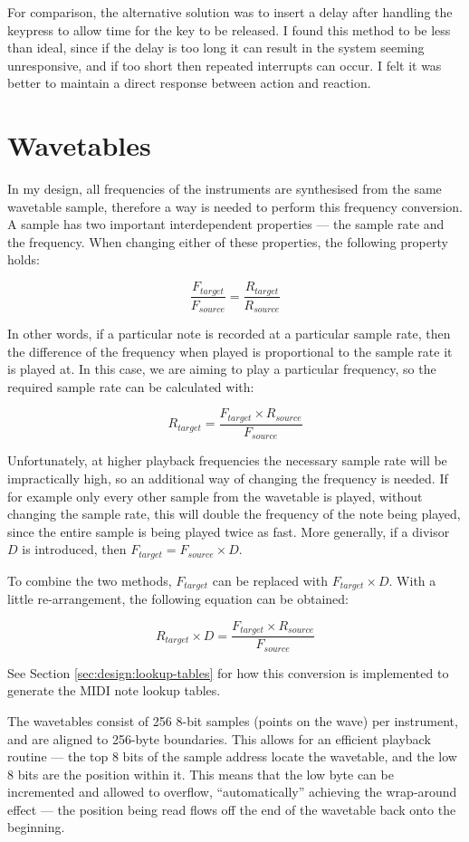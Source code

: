 For comparison, the alternative solution was to insert a delay after handling the keypress to allow 
time for the key to be released.  I found this method to be less than ideal, since if the delay is 
too long it can result in the system seeming unresponsive, and if too short then repeated interrupts 
can occur.  I felt it was better to maintain a direct response between action and reaction.


\section{Wavetables}
\label{sec:design:wavetables}

In my design, all frequencies of the instruments are synthesised from the same wavetable sample, 
therefore a way is needed to perform this frequency conversion.  A sample has two important 
interdependent properties --- the sample rate and the frequency.  When changing either of these 
properties, the following property holds:

\[\frac{F_{target}}{F_{source}} = \frac{R_{target}}{R_{source}}\]

In other words, if a particular note is recorded at a particular sample rate, then the difference of 
the frequency when played is proportional to the sample rate it is played at.  In this case, we are 
aiming to play a particular frequency, so the required sample rate can be calculated with:

\[R_{target} = \frac{F_{target} \times R_{source}}{F_{source}}\]

Unfortunately, at higher playback frequencies the necessary sample rate will be impractically high, 
so an additional way of changing the frequency is needed.  If for example only every other sample 
from the wavetable is played, without changing the sample rate, this will double the frequency of 
the note being played, since the entire sample is being played twice as fast.  More generally, if a 
divisor $D$ is introduced, then $F_{target} = F_{source} \times D$.

To combine the two methods, $F_{target}$ can be replaced with $F_{target} \times D$.  With a little 
re-arrangement, the following equation can be obtained:

\[R_{target} \times D = \frac{F_{target} \times R_{source}}{F_{source}}\]

See Section \ref{sec:design:lookup-tables} for how this conversion is implemented to generate the 
MIDI note lookup tables.

The wavetables consist of 256 8-bit samples (points on the wave) per instrument, and are aligned to 
256-byte boundaries.  This allows for an efficient playback routine --- the top 8 bits of the sample 
address locate the wavetable, and the low 8 bits are the position within it.  This means that the 
low byte can be incremented and allowed to overflow, ``automatically'' achieving the wrap-around 
effect --- the position being read flows off the end of the wavetable back onto the beginning.


